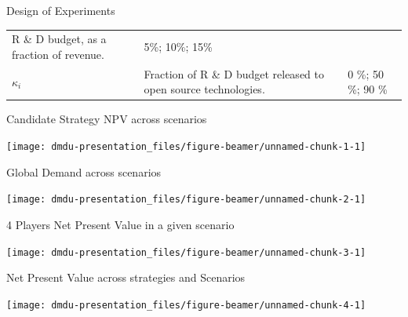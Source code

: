 \documentclass[ignorenonframetext,]{beamer}
\begin{document}
\begin{frame}{Design of Experiments}
\begin{longtable}[]{@{}lll@{}}
\begin{minipage}[t]{0.47\columnwidth}
R \& D budget, as a fraction of revenue.\strut
\end{minipage} & \begin{minipage}[t]{0.30\columnwidth}\raggedright\strut
5\%; 10\%; 15\%\strut
\end{minipage}\tabularnewline
\begin{minipage}[t]{0.14\columnwidth}\raggedright\strut
\(\kappa_i\)\strut
\end{minipage} & \begin{minipage}[t]{0.47\columnwidth}\raggedright\strut
Fraction of R \& D budget released to open source technologies.\strut
\end{minipage} & \begin{minipage}[t]{0.30\columnwidth}\raggedright\strut
0 \%; 50 \%; 90 \%\strut
\end{minipage}\tabularnewline
\bottomrule
\end{longtable}

\end{frame}

\begin{frame}{Candidate Strategy NPV across scenarios}

\begin{center}\texttt{[image: dmdu-presentation\_files/figure-beamer/unnamed-chunk-1-1]} \end{center}

\end{frame}

\begin{frame}{Global Demand across scenarios}

\begin{center}\texttt{[image: dmdu-presentation\_files/figure-beamer/unnamed-chunk-2-1]} \end{center}

\end{frame}

\begin{frame}{4 Players Net Present Value in a given scenario}

\begin{center}\texttt{[image: dmdu-presentation\_files/figure-beamer/unnamed-chunk-3-1]} \end{center}

\end{frame}

\begin{frame}{Net Present Value across strategies and Scenarios}

\begin{center}\texttt{[image: dmdu-presentation\_files/figure-beamer/unnamed-chunk-4-1]} \end{center}

\end{frame}
\end{document}
